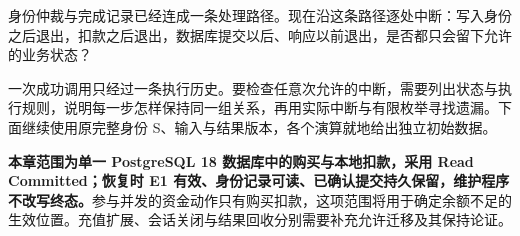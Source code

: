 身份仲裁与完成记录已经连成一条处理路径。现在沿这条路径逐处中断：写入身份之后退出，扣款之后退出，数据库提交以后、响应以前退出，是否都只会留下允许的业务状态？

一次成功调用只经过一条执行历史。要检查任意次允许的中断，需要列出状态与执行规则，说明每一步怎样保持同一组关系，再用实际中断与有限枚举寻找遗漏。下面继续使用原完整身份 S、输入与结果版本，各个演算就地给出独立初始数据。

\textbf{本章范围为单一 PostgreSQL 18 数据库中的购买与本地扣款，采用 Read Committed；恢复时 E1 有效、身份记录可读、已确认提交持久保留，维护程序不改写终态。}参与并发的资金动作只有购买扣款，这项范围将用于确定余额不足的生效位置。充值扩展、会话关闭与结果回收分别需要补充允许迁移及其保持论证。
